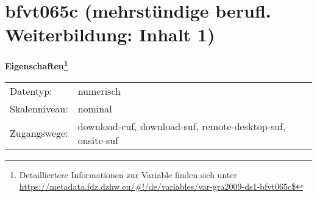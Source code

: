 
    \setcounter{footnote}{0}

    \vspace*{-1.8cm}
	\section{bfvt065c (mehrstündige berufl. Weiterbildung: Inhalt 1)}
	\label{section:bfvt065c}



    \vspace*{0.5cm}
    \noindent\textbf{Eigenschaften\footnote{Detailliertere Informationen zur Variable finden sich unter
		\url{https://metadata.fdz.dzhw.eu/\#!/de/variables/var-gra2009-ds1-bfvt065c$}}}\\
	\begin{tabularx}{\hsize}{@{}lX}
	Datentyp: & numerisch \\
	Skalenniveau: & nominal \\
	Zugangswege: &
	  download-cuf, 
	  download-suf, 
	  remote-desktop-suf, 
	  onsite-suf
 \\
    \end{tabularx}



